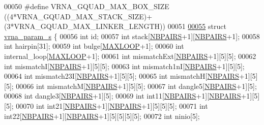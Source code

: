 \begin{DoxyCode}
00050 \textcolor{preprocessor}{#define   VRNA\_GQUAD\_MAX\_BOX\_SIZE       ((4*VRNA\_GQUAD\_MAX\_STACK\_SIZE)+(3*VRNA\_GQUAD\_MAX\_LINKER\_LENGTH))}
00051 
\hypertarget{params_8h_source.tex_l00055}{}\hyperlink{group__energy__parameters}{00055} \textcolor{keyword}{struct }\hyperlink{group__energy__parameters_structvrna__param__s}{vrna\_param\_s} \{
00056   \textcolor{keywordtype}{int}     id;
00057   \textcolor{keywordtype}{int}     stack[\hyperlink{energy__const_8h_a5e75221c779d618eab81e096f37e32ce}{NBPAIRS}+1][\hyperlink{energy__const_8h_a5e75221c779d618eab81e096f37e32ce}{NBPAIRS}+1];
00058   \textcolor{keywordtype}{int}     hairpin[31];
00059   \textcolor{keywordtype}{int}     bulge[\hyperlink{energy__const_8h_ad1bd6eabac419670ddd3c9ed82145988}{MAXLOOP}+1];
00060   \textcolor{keywordtype}{int}     internal\_loop[\hyperlink{energy__const_8h_ad1bd6eabac419670ddd3c9ed82145988}{MAXLOOP}+1];
00061   \textcolor{keywordtype}{int}     mismatchExt[\hyperlink{energy__const_8h_a5e75221c779d618eab81e096f37e32ce}{NBPAIRS}+1][5][5];
00062   \textcolor{keywordtype}{int}     mismatchI[\hyperlink{energy__const_8h_a5e75221c779d618eab81e096f37e32ce}{NBPAIRS}+1][5][5];
00063   \textcolor{keywordtype}{int}     mismatch1nI[\hyperlink{energy__const_8h_a5e75221c779d618eab81e096f37e32ce}{NBPAIRS}+1][5][5];
00064   \textcolor{keywordtype}{int}     mismatch23I[\hyperlink{energy__const_8h_a5e75221c779d618eab81e096f37e32ce}{NBPAIRS}+1][5][5];
00065   \textcolor{keywordtype}{int}     mismatchH[\hyperlink{energy__const_8h_a5e75221c779d618eab81e096f37e32ce}{NBPAIRS}+1][5][5];
00066   \textcolor{keywordtype}{int}     mismatchM[\hyperlink{energy__const_8h_a5e75221c779d618eab81e096f37e32ce}{NBPAIRS}+1][5][5];
00067   \textcolor{keywordtype}{int}     dangle5[\hyperlink{energy__const_8h_a5e75221c779d618eab81e096f37e32ce}{NBPAIRS}+1][5];
00068   \textcolor{keywordtype}{int}     dangle3[\hyperlink{energy__const_8h_a5e75221c779d618eab81e096f37e32ce}{NBPAIRS}+1][5];
00069   \textcolor{keywordtype}{int}     int11[\hyperlink{energy__const_8h_a5e75221c779d618eab81e096f37e32ce}{NBPAIRS}+1][\hyperlink{energy__const_8h_a5e75221c779d618eab81e096f37e32ce}{NBPAIRS}+1][5][5];
00070   \textcolor{keywordtype}{int}     int21[\hyperlink{energy__const_8h_a5e75221c779d618eab81e096f37e32ce}{NBPAIRS}+1][\hyperlink{energy__const_8h_a5e75221c779d618eab81e096f37e32ce}{NBPAIRS}+1][5][5][5];
00071   \textcolor{keywordtype}{int}     int22[\hyperlink{energy__const_8h_a5e75221c779d618eab81e096f37e32ce}{NBPAIRS}+1][\hyperlink{energy__const_8h_a5e75221c779d618eab81e096f37e32ce}{NBPAIRS}+1][5][5][5][5];
00072   \textcolor{keywordtype}{int}     ninio[5];

\end{DoxyCode}
